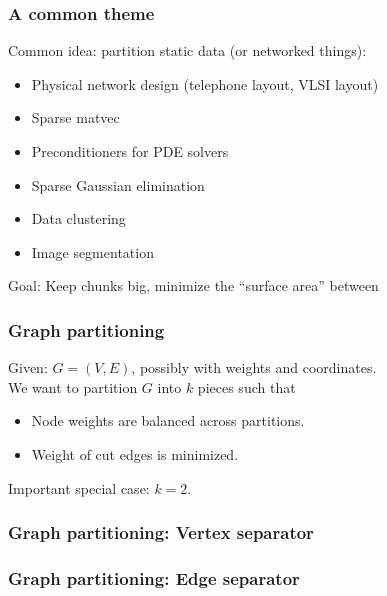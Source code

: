 \documentclass{beamer}
\begin{document}
\begin{frame}
  \frametitle{A common theme}

  Common idea: partition static data (or networked things):
  \begin{itemize}
  \item Physical network design (telephone layout, VLSI layout)
  \item Sparse matvec
  \item Preconditioners for PDE solvers
  \item Sparse Gaussian elimination
  \item Data clustering
  \item Image segmentation
  \end{itemize}
  Goal: Keep chunks big, minimize the ``surface area'' between
\end{frame}


\begin{frame}
  \frametitle{Graph partitioning}

  \begin{center}
    \begin{tikzpicture}[scale=0.7]
      
    \end{tikzpicture}
  \end{center}
  
  Given: $G = (V,E)$, possibly with weights and coordinates. \\
  We want to partition $G$ into $k$ pieces such that
  \begin{itemize}
  \item
    Node weights are balanced across partitions.
  \item
    Weight of cut edges is minimized.
  \end{itemize}
  Important special case: $k = 2$.

\end{frame}


\begin{frame}
  \frametitle{Graph partitioning: Vertex separator}

  \begin{center}
    \begin{tikzpicture}
      
    \end{tikzpicture}
  \end{center}
\end{frame}


\begin{frame}
  \frametitle{Graph partitioning: Edge separator}

  \begin{center}
    \begin{tikzpicture}
      
    \end{tikzpicture}
  \end{center}
\end{frame}
\end{document}
